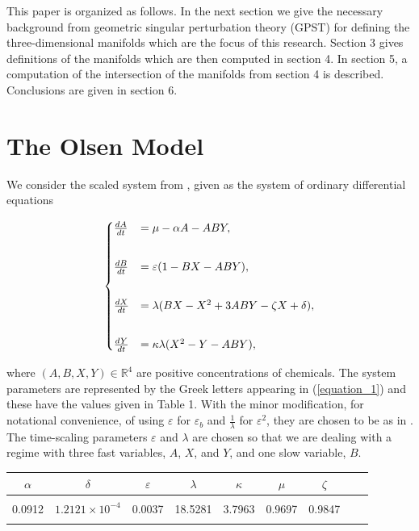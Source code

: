 \documentclass{ws-ijbc}
\begin{document}
This paper is organized as follows.  In the next section we give the necessary background from geometric singular perturbation theory (GPST) for defining the three-dimensional manifolds which are the focus of this research.  Section 3 gives definitions of the manifolds which are then computed in section 4.  In section 5, a computation of the intersection of the manifolds from section 4 is described.  Conclusions are given in section 6.

\section{The Olsen Model}

We consider the scaled system from \cite{Rescaling}, given as the system of ordinary differential equations
    
\begin{equation}
\begin{aligned}
\begin{cases}
\frac{dA}{dt} &= \mu - \alpha A - ABY, \\ \vspace{2mm}\\
\frac{dB}{dt} &= \varepsilon(1-BX - ABY), \\ \vspace{2mm}\\
\frac{dX}{dt} &= \lambda(BX - X^2 +3ABY - \zeta X + \delta), \\ \vspace{2mm}\\
\frac{dY}{dt} &= \kappa\lambda(X^2 - Y - ABY),
\end{cases}
\end{aligned}
\label{equation_1}
\end{equation}
    
\noindent
where $(A, B, X, Y)\in\mathbb{R}^{4}$ are positive concentrations of chemicals.  The system parameters are represented by the Greek letters appearing in (\ref{equation_1}) and these have the values given in Table 1.  With the minor modification, for notational convenience, of using $\varepsilon$ for $\varepsilon_{b}$ and $\frac{1}{\lambda}$ for $\varepsilon^{2}$, they are chosen to be as in \cite{Rescaling}.  The time-scaling parameters $\varepsilon$ and $\lambda$ are chosen so that we are dealing with a regime with three fast variables, $A$, $X$, and $Y$, and one slow variable, $B$.

\begin{table}[h]
{\begin{tabular}{c  c  c  c  c  c  c  c  c} \\[-2pt]
\toprule
$\alpha$ & $\delta$ & $\varepsilon$ & $\lambda$ & $\kappa$ & $\mu$ & $\zeta$ \\[6pt]
\hline\\[-2pt]
0.0912 & $1.2121 \times 10^{-4}$ & 0.0037 & 18.5281 & 3.7963 & 0.9697 & 0.9847\\[1pt]
\botrule
\end{tabular}}
\end{table}
    
\end{document}
